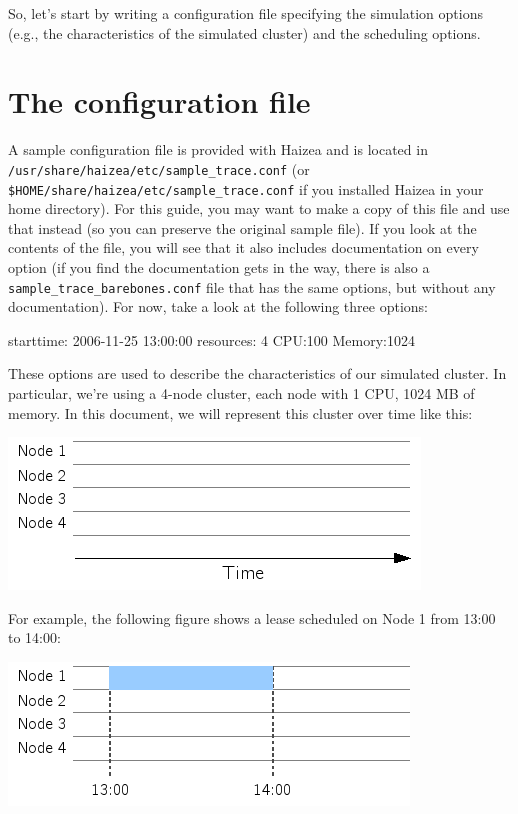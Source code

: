 So, let's start by writing a configuration file specifying the simulation options (e.g., the characteristics of the simulated cluster) and the scheduling options.

\section{The configuration file}

A sample configuration file is provided with Haizea and is located in \texttt{/usr/share/haizea/etc/sample\_trace.conf} (or \texttt{\$HOME/share/haizea/etc/sample\_trace.conf} if you installed Haizea in your home directory). For this guide, you may want to make a copy of this file and use that instead (so you can preserve the original sample file). If you look at the contents of the file, you will see that it also includes documentation on every option (if you find the documentation gets in the way, there is also a \texttt{sample\_trace\_barebones.conf} file that has the same options, but without any documentation). For now, take a look at the following three options:

\begin{wideshellverbatim}
[simulation]
starttime: 2006-11-25 13:00:00
resources: 4  CPU:100 Memory:1024
\end{wideshellverbatim}

These options are used to describe the characteristics of our simulated cluster. In particular, we're using a 4-node cluster, each node with 1 CPU, 1024 MB of memory. In this document, we will represent this cluster over time like this:

\begin{center}
\includegraphics{images/quickstart_leasegraph1.png}
\end{center}

For example, the following figure shows a lease scheduled on Node 1 from 13:00 to 14:00:

\begin{center}
\includegraphics{images/quickstart_leasegraph2.png}
\end{center}

